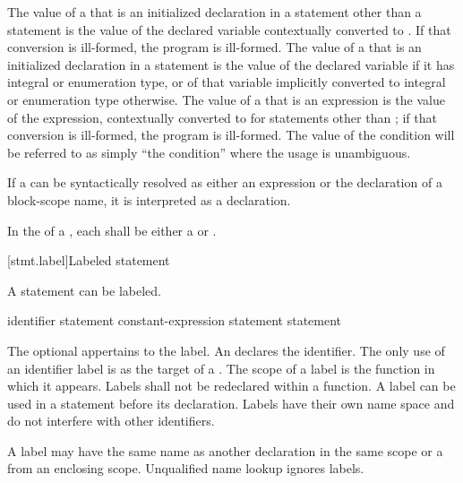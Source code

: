 \pnum
The value of a  that is an initialized declaration
in a statement other than a  statement is the value of the
declared variable
contextually converted to .
If that
conversion is ill-formed, the program is ill-formed. The value of a
 that is an initialized declaration in a
 statement is the value of the declared variable if it has
integral or enumeration type, or of that variable implicitly converted
to integral or enumeration type otherwise. The value of a
 that is an expression is the value of the
expression, contextually converted to 
for statements other
than ;
if that conversion is ill-formed, the program is
ill-formed. The value of the condition will be referred to as simply
``the condition'' where the usage is unambiguous.

\pnum
If a  can be syntactically resolved as either an
expression or the declaration of a block-scope name, it is interpreted as a
declaration.

\pnum
In the  of a , each
 shall be either a 
or .

[stmt.label]{Labeled statement}%

\pnum
{}%
%
A statement can be labeled.

\begin{bnf}
\br
     identifier \terminal{:} statement\br
      constant-expression \terminal{:} statement\br
      \terminal{:} statement
\end{bnf}

The optional  appertains to the label. An
 declares the identifier. The only use of an
identifier label is as the target of a
%
.
%
The scope of a label is the function in which it appears. Labels shall
not be redeclared within a function. A label can be used in a
 statement before its declaration.
%
Labels have their own name space and do not interfere with other
identifiers.
\begin{note}
A label may have the same name as another declaration in the same scope or a
 from an enclosing scope. Unqualified name
lookup ignores labels.
\end{note}

